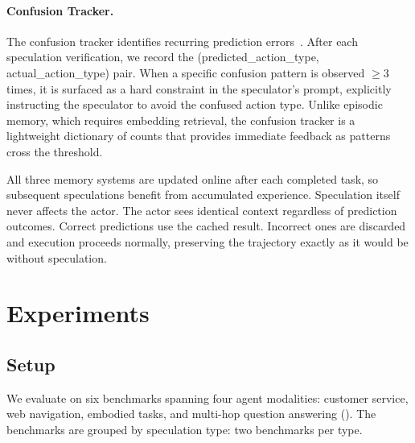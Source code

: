 \documentclass{article}
\begin{document}
\paragraph{Confusion Tracker.}
The confusion tracker identifies recurring prediction errors~\citep{shinn2023reflexion,zhao2024expel}. After each speculation verification, we record the (predicted\_action\_type, actual\_action\_type) pair. When a specific confusion pattern is observed $\ge 3$ times, it is surfaced as a hard constraint in the speculator's prompt, explicitly instructing the speculator to avoid the confused action type. Unlike episodic memory, which requires embedding retrieval, the confusion tracker is a lightweight dictionary of counts that provides immediate feedback as patterns cross the threshold.

All three memory systems are updated online after each completed task, so subsequent speculations benefit from accumulated experience. Speculation itself never affects the actor. The actor sees identical context regardless of prediction outcomes. Correct predictions use the cached result. Incorrect ones are discarded and execution proceeds normally, preserving the trajectory exactly as it would be without speculation.


\section{Experiments}
\label{sec:experiments}

\subsection{Setup}
\label{sec:setup}
We evaluate on six benchmarks spanning four agent modalities: customer service, web navigation, embodied tasks, and multi-hop question answering (). The benchmarks are grouped by speculation type: two benchmarks per type.


\end{document}
